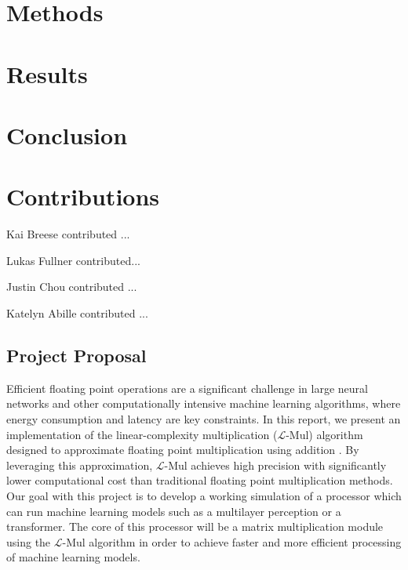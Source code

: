 \documentclass[12pt,letterpaper]{article}
\newcommand{\lmul}{$\mathcal{L}$-Mul\xspace}
\begin{document}
\section{Methods}

\section{Results}


\section{Conclusion}

\section{Contributions}

Kai Breese contributed ...

Lukas Fullner contributed...

Justin Chou contributed ...

Katelyn Abille contributed ...


\makereference






\clearpage
\makeappendix

\subsection{Project Proposal}

Efficient floating point operations are a significant challenge in large neural networks and other computationally intensive machine learning algorithms, where energy consumption and latency are key constraints. In this report, we present an implementation of the linear-complexity multiplication (\lmul) algorithm designed to approximate floating point multiplication using addition \citep{luo2024addition}. By leveraging this approximation, \lmul achieves high precision with significantly lower computational cost than traditional floating point multiplication methods.  Our goal with this project is to develop a working simulation of a processor which can run machine learning models such as a multilayer perception or a transformer.  The core of this processor will be a matrix multiplication module using the \lmul algorithm in order to achieve faster and more efficient processing of machine learning models.
\end{document}

